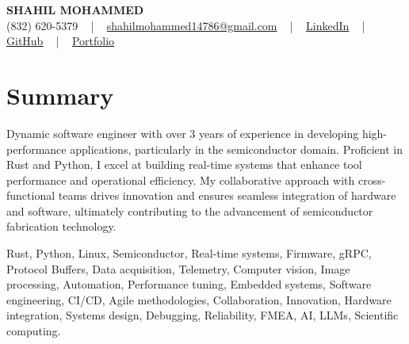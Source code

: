 \documentclass[letterpaper,10pt]{article}
\begin{document}
\begin{center}
    {\fontsize{14pt}{12pt}\selectfont \textbf{\MakeUppercase{Shahil Mohammed}}}\\ \vspace{2pt}
    \fontsize{10pt}{12pt}\selectfont (832) 620-5379 ~ | ~ \href{mailto:shahilmohammed14786@gmail.com}{shahilmohammed14786@gmail.com} ~ | ~  
    \href{https://www.linkedin.com/in/shahil-mohammed-9652931a1/}{\color{blue}\underline{LinkedIn}}  ~ | ~ 
    \href{https://github.com/freakbeast14}{\color{blue}\underline{GitHub}} ~ | ~ 
    \href{https://shahil-mohammed.netlify.app/}{\color{blue}\underline{Portfolio}}
    \vspace{-8pt}
\end{center}

\section{Summary}
\vspace{-2pt}\fontsize{8pt}{9pt}\selectfont
Dynamic software engineer with over 3 years of experience in developing high-performance applications, particularly in the semiconductor domain. Proficient in Rust and Python, I excel at building real-time systems that enhance tool performance and operational efficiency. My collaborative approach with cross-functional teams drives innovation and ensures seamless integration of hardware and software, ultimately contributing to the advancement of semiconductor fabrication technology. 
 \vspace{-5pt}
 
{\fontsize{1pt}{1pt}\selectfont\color{white}
Rust, Python, Linux, Semiconductor, Real-time systems, Firmware, gRPC, Protocol Buffers, Data acquisition, Telemetry, Computer vision, Image processing, Automation, Performance tuning, Embedded systems, Software engineering, CI/CD, Agile methodologies, Collaboration, Innovation, Hardware integration, Systems design, Debugging, Reliability, FMEA, AI, LLMs, Scientific computing.
}
\vspace{-8pt}

\vspace{-2pt}
\end{document}
